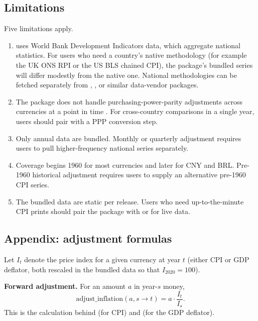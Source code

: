 \subsection{Limitations}\label{limitations}

Five limitations apply.

\begin{enumerate}
\def\labelenumi{\arabic{enumi}.}
\tightlist
\item
   uses World Bank Development Indicators data, which
  aggregate national statistics. For users who need a country's native
  methodology (for example the UK ONS RPI or the US BLS chained CPI),
  the package's bundled series will differ modestly from the native one.
  National methodologies can be fetched separately from ,
  , or similar data-vendor packages.
\item
  The package does not handle purchasing-power-parity adjustments across
  currencies at a point in time \citep{deaton2010price}. For
  cross-country comparisons in a single year, users should pair
   with a PPP conversion step.
\item
  Only annual data are bundled. Monthly or quarterly adjustment requires
  users to pull higher-frequency national series separately.
\item
  Coverage begins 1960 for most currencies and later for CNY and BRL.
  Pre-1960 historical adjustment requires users to supply an alternative
  pre-1960 CPI series.
\item
  The bundled data are static per release. Users who need
  up-to-the-minute CPI prints should pair the package with 
  or  for live data.
\end{enumerate}

\FloatBarrier

\subsection{Appendix: adjustment
formulas}\label{appendix-adjustment-formulas}

Let \(I_t\) denote the price index for a given currency at year \(t\)
(either CPI or GDP deflator, both rescaled in the bundled data so that
\(I_{2020} = 100\)).

\textbf{Forward adjustment.} For an amount \(a\) in year-\(s\) money,
\[\mathrm{adjust\_inflation}(a, s \to t) = a \cdot \frac{I_t}{I_s}.\]
This is the calculation behind  (for CPI) and
 (for the GDP deflator).

